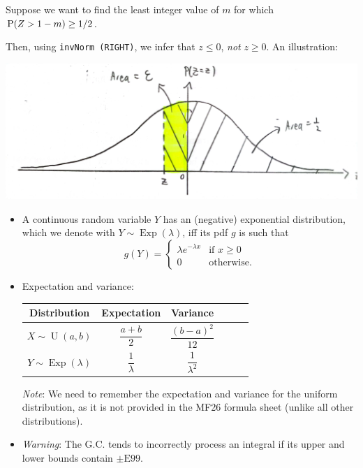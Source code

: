 \documentclass[../Notes.tex]{subfiles}
\begin{document}
\begin{example}{}{}
  Suppose we want to find the least integer value of \(m\) for which \(\operatorname{P}(Z>1-m)\geq 1/2\).

  Then, using \texttt{invNorm (RIGHT)}, we infer that \(z\leq 0\), \emph{not} \(z\geq 0\). An illustration: 
  \begin{center}
    \includegraphics[width=\textwidth]{../images/Special-Continuous-Random-Variables-Example-Illustration.jpg}
  \end{center}
\end{example}
\begin{stbox}{}
  \begin{itemize}
    \setcounter{enumi}{7}
    \item A continuous random variable \(Y\) has an (negative) exponential distribution, which we denote with \(Y\sim \operatorname{Exp}(\lambda)\), iff its pdf \(g\) is such that
    \[g(Y)=
    \begin{cases}
      \lambda e^{-\lambda x} &\text{if \(x\geq 0\)}\\
      0 &\text{otherwise.}
    \end{cases}\]
    \item Expectation and variance:

    \begin{center}
      \begin{tabular}{|Sc|Sc|Sc|}
        \hline
        Distribution & Expectation & Variance\\
        \hline
        \(X\sim \operatorname{U}(a,b)\) & \(\dfrac{a+b}{2}\) & \(\dfrac{(b-a)^2}{12}\)\\
        \hline
        \(Y\sim \operatorname{Exp}(\lambda)\) & \(\dfrac{1}{\lambda}\) & \(\dfrac{1}{\lambda^2}\)\\
        \hline
      \end{tabular} 
    \end{center}
    \emph{Note}: We need to remember the expectation and variance for the uniform distribution, as it is not provided in the MF26 formula sheet (unlike all other distributions).
    \item \emph{Warning}: The G.C. tends to incorrectly process an integral if its upper and lower bounds contain \(\pm \text{E}99\).
  \end{itemize}
\end{stbox}
\end{document}
